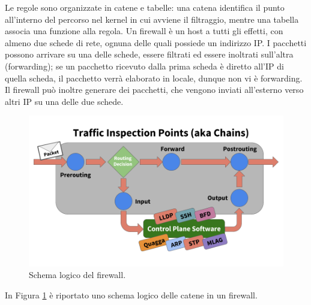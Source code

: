 Le regole sono organizzate in catene e tabelle: una catena identifica il punto all'interno del percorso nel kernel in cui avviene il filtraggio, mentre una tabella associa una funzione alla regola. Un firewall è un host a tutti gli effetti, con almeno due schede di rete, ognuna delle quali possiede un indirizzo IP. I pacchetti possono arrivare su una delle schede, essere filtrati ed essere inoltrati sull'altra (forwarding); se un pacchetto ricevuto dalla prima scheda è diretto all'IP di quella scheda, il pacchetto verrà elaborato in locale, dunque non vi è forwarding. Il firewall può inoltre generare dei pacchetti, che vengono inviati all'esterno verso altri IP su una delle due schede.
\begin{figure}[htbp]
	\centering
%		
	\includegraphics[scale = 0.4]{images/firewall-logic-scheme}
	\caption{Schema logico del firewall.}
	\label{img:schema-logico-firewall}
\end{figure}
\newpage
In Figura \ref{img:schema-logico-firewall} è riportato uno schema logico delle catene in un firewall. 
